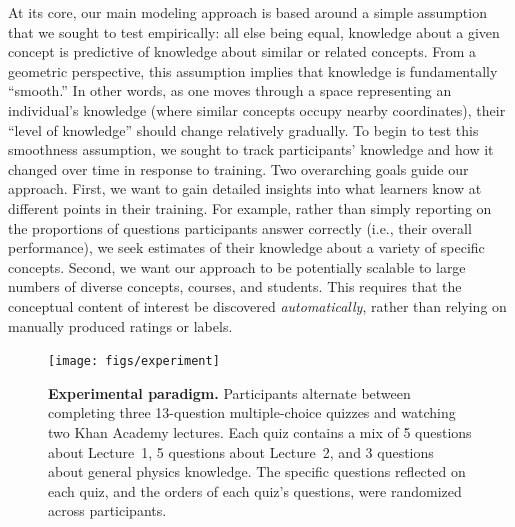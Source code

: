 \documentclass[10pt]{article}
\begin{document}
At its core, our main modeling approach is based around a simple assumption
that we sought to test empirically: all else being equal, knowledge about a
given concept is predictive of knowledge about similar or related concepts.
From a geometric perspective, this assumption implies that knowledge is
fundamentally ``smooth.'' In other words, as one moves through a space
representing an individual's knowledge (where similar concepts occupy nearby
coordinates), their ``level of knowledge'' should change relatively gradually.
To begin to test this smoothness assumption, we sought to track participants'
knowledge and how it changed over time in response to training. Two overarching
goals guide our approach. First, we want to gain detailed insights into what
learners know at different points in their training. For example, rather than
simply reporting on the proportions of questions participants answer correctly
(i.e., their overall performance), we seek estimates of their knowledge about a
variety of specific concepts. Second, we want our approach to be potentially
scalable to large numbers of diverse concepts, courses, and students. This
requires that the conceptual content of interest be discovered
\textit{automatically}, rather than relying on manually produced ratings or
labels.

\begin{figure}[tp]
    \centering
    \texttt{[image: figs/experiment]}

    \caption{\textbf{Experimental paradigm.} Participants alternate between
    completing three 13-question multiple-choice quizzes and watching two Khan
    Academy lectures. Each quiz contains a mix of 5 questions about Lecture~1,
    5 questions about Lecture~2, and 3 questions about general physics
    knowledge. The specific questions reflected on each quiz, and the orders of
    each quiz's questions, were randomized across participants.}

    \label{fig:experiment}
\end{figure}
\end{document}
